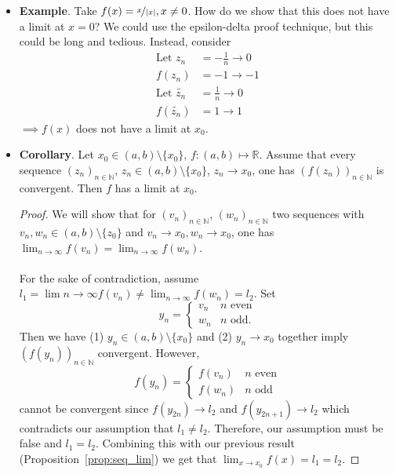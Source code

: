 \documentclass{article}
\newcommand{\R}{\mathbb{R}}
\newcommand{\N}{\mathbb{N}}
\newcommand{\seq}[2]{(#1_{#2})_{#2 \in \N}}
\newcommand{\?}{\stackrel{?}{=}}
\theoremstyle{definition} %
\begin{document}
\begin{itemize}
    \item \textbf{Example}. Take $f(x) = \nicefrac{x}{|x|}, x \neq 0$. How do we show that this does not have a limit at $x = 0$? We could use the epsilon-delta proof technique, but this could be long and tedious. Instead, consider
    \begin{align*}
        \text{Let } z_n &= -\frac{1}{n} \rightarrow 0 \\
        f(z_n) &= -1 \rightarrow -1 \\
        \text{Let } \widetilde{z_n}& = \frac{1}{n} \rightarrow 0 \\
        f(\widetilde{z_n}) &= 1 \rightarrow 1
    \end{align*}
    $\implies f(x)$ does not have a limit at $x_0$.
    \item \textbf{Corollary}. Let $x_0 \in (a, b) \setminus \{x_0\}$, $f: (a, b) \mapsto \R$. Assume that every sequence $\seq{z}{n}$, $z_n \in (a, b) \setminus \{x_0\}$, $z_n \rightarrow x_0$, one has $(f(z_n))_{n \in \N}$ is convergent. Then $f$ has a limit at $x_0$.
    \begin{proof}
        We will show that for $\seq{v}{n}$, $\seq{w}{n}$ two sequences with $v_n, w_n \in (a, b) \setminus \{z_0\}$ and $v_n \rightarrow x_0, w_n \rightarrow x_0$, one has $\lim_{n \to \infty} f(v_n) = \lim_{n \to \infty} f(w_n)$. \\\\
        For the sake of contradiction, assume $l_1 = \lim{n \to \infty} f(v_n) \neq \lim_{n \to \infty} f(w_n) = l_2$. Set
        \[ y_n =
        \begin{cases}
            v_n & n \text{ even} \\
            w_n & n \text{ odd}.
        \end{cases}
        \]
        Then we have (1) $y_n \in (a, b) \setminus \{x_0\}$ and (2) $y_n \rightarrow x_0$ together imply $(f(y_n))_{n \in \N}$ convergent. However,
        \[
        f(y_n) =
        \begin{cases}
            f(v_n) & n \text{ even} \\
            f(w_n) & n \text{ odd}
        \end{cases}
        \]
        cannot be convergent since $f(y_{2n}) \rightarrow l_2$ and $f(y_{2n + 1}) \rightarrow l_2$ which contradicts our assumption that $l_1 \neq l_2$. Therefore, our assumption must be false and $l_1 = l_2$. Combining this with our previous result (Proposition~\ref{prop:seq_lim}) we get that $\lim_{x \to x_0} f(x) = l_1 = l_2$.
    \end{proof}

\end{itemize}
\end{document}
